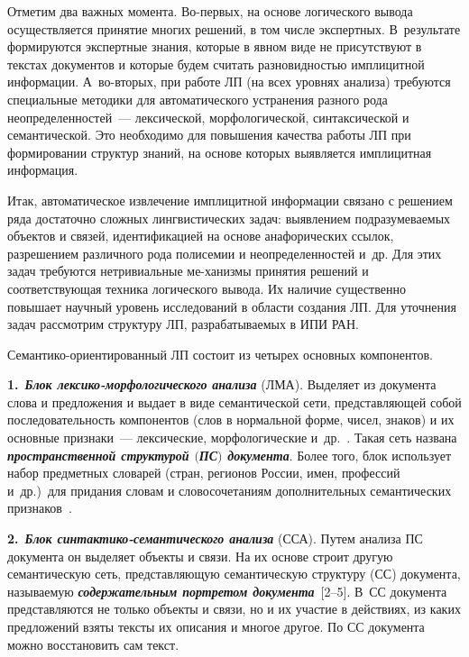 \begin{multicols}{2}
     Отметим два важных момента. Во-пер\-вых, на основе логического 
вывода осуществляется принятие многих решений, в том числе экспертных. 
В~результате формируются экспертные знания, которые в явном виде не 
присутствуют в текстах документов и которые будем считать разновидностью 
имплицитной информации. А~во-вто\-рых, при работе ЛП (на всех уровнях 
анализа) требуются специальные методики для автоматического устранения 
разного рода неопределенностей~--- лексической, морфологической, 
синтаксической и семантической. Это необходимо для повышения качества 
работы ЛП при формировании структур знаний, на основе которых выявляется 
имплицитная информация. 
     
     Итак, автоматическое извлечение имплицитной информации связано с 
решением ряда достаточно сложных лингвистических задач: выявлением 
подразумеваемых объектов и связей, идентификацией на основе анафорических 
ссылок, разрешением различного рода полисемии и неопределенностей и~др. 
Для этих задач требуются нетривиальные ме-\linebreak ханизмы принятия решений и 
соответствующая техника логического вывода. Их наличие сущест\-венно 
повышает научный уровень исследований в области создания ЛП. Для 
уточнения задач рас\-смот\-рим структуру ЛП, 
разрабатываемых в ИПИ РАН. 
     
     Семантико-ориентированный ЛП состоит из четырех основных 
компонентов.
     
\smallskip

     \textbf{1.}\ {\bfseries\textit{Блок лексико-морфологического анализа}} (ЛМА). 
Выделяет из документа слова и предложения и выдает в виде семантической 
сети, пред\-став\-ля\-ющей собой последовательность компонентов (слов в 
нормальной форме, чисел, знаков) и их основные признаки~--- лексические, 
морфологические и~др.~\cite{13kuz, 15kuz}. Такая сеть названа 
{\bfseries\textit{пространственной структурой $($ПС$)$ документа}}. 
Более того, блок использует набор предметных словарей (стран, 
регионов России, имен, профессий и~др.)\ для придания словам и 
словосочетаниям дополнительных семантических признаков~\cite{12kuz}.

\smallskip
     
\textbf{2.}\      {\bfseries\textit{Блок синтактико-семантического анализа}} (ССА). 
Путем анализа ПС документа он выделяет объекты и связи. На их основе 
строит другую семантическую сеть, представляющую семантическую 
структуру (СС) документа, называемую {\bfseries\textit{содержательным 
портретом документа}}~[2--5]. В~СС документа представляются не только 
объекты и связи, но и их участие в действиях, из каких предложений взяты 
тексты их описания и многое другое. По СС документа можно восстановить 
сам текст. 
     

\end{multicols}
